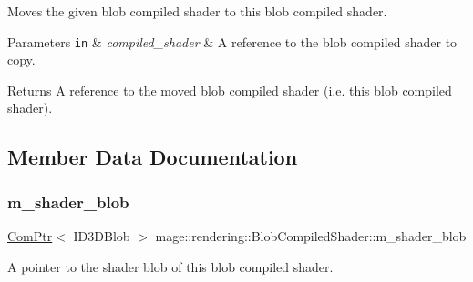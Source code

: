 Moves the given blob compiled shader to this blob compiled shader.


\begin{DoxyParams}[1]{Parameters}
\mbox{\tt in}  & {\em compiled\+\_\+shader} & A reference to the blob compiled shader to copy. \\
\hline
\end{DoxyParams}
\begin{DoxyReturn}{Returns}
A reference to the moved blob compiled shader (i.\+e. this blob compiled shader). 
\end{DoxyReturn}


\subsection{Member Data Documentation}
\hypertarget{classmage_1_1rendering_1_1_blob_compiled_shader_ad28d77dc5fd97d127c2e2dc875384449}{}\label{classmage_1_1rendering_1_1_blob_compiled_shader_ad28d77dc5fd97d127c2e2dc875384449} 
\subsubsection{\texorpdfstring{m\+\_\+shader\+\_\+blob}{m\_shader\_blob}}
{\footnotesize\ttfamily \hyperlink{namespacemage_ae74f374780900893caa5555d1031fd79}{Com\+Ptr}$<$ I\+D3\+D\+Blob $>$ mage\+::rendering\+::\+Blob\+Compiled\+Shader\+::m\+\_\+shader\+\_\+blob\hspace{0.3cm}{\ttfamily [private]}}

A pointer to the shader blob of this blob compiled shader. 